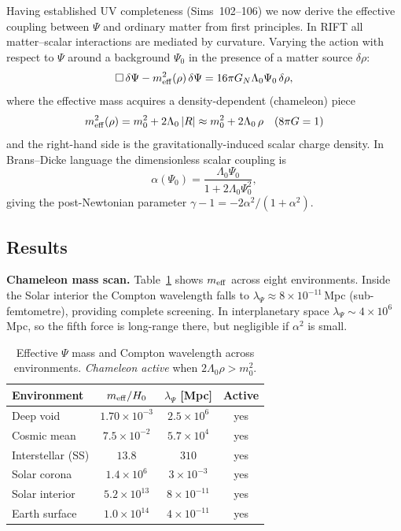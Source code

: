 \documentclass[12pt,a4paper]{article}
\begin{document}
Having established UV completeness (Sims~102--106) we now derive the
effective coupling between $\Psi$ and ordinary matter from first principles.
In RIFT all matter--scalar interactions are mediated by curvature.  Varying
the action with respect to $\Psi$ around a background $\Psi_0$ in the
presence of a matter source $\delta\rho$:
\begin{equation}
  \Box\,\delta\Psi - m_{\rm eff}^2(\rho)\,\delta\Psi
  = 16\pi G_N \Lambda_0 \Psi_0\,\delta\rho ,
  \label{eq:dPsi}
\end{equation}
where the effective mass acquires a density-dependent (chameleon) piece
\begin{equation}
  m_{\rm eff}^2(\rho) = m_0^2 + 2\Lambda_0\,|R| \approx m_0^2 + 2\Lambda_0\,\rho
  \quad (8\pi G=1)
\end{equation}
and the right-hand side is the gravitationally-induced scalar charge density.
In Brans--Dicke language the dimensionless scalar coupling is
\begin{equation}
  \alpha(\Psi_0) = \frac{\Lambda_0\Psi_0}{1 + 2\Lambda_0\Psi_0^2} ,
\end{equation}
giving the post-Newtonian parameter $\gamma-1 = -2\alpha^2/(1+\alpha^2)$.

\subsection{Results}

\textbf{Chameleon mass scan.}
Table~\ref{tab:sim107_env} shows $m_{\rm eff}$ across eight environments.
Inside the Solar interior the Compton wavelength falls to
$\lambda_\Psi \approx 8\times10^{-11}$\,Mpc (sub-femtometre), providing
complete screening.  In interplanetary space $\lambda_\Psi \sim 4\times10^6$\,Mpc,
so the fifth force is long-range there, but negligible if $\alpha^2$ is small.

\begin{table}[h]
\centering
\caption{Effective $\Psi$ mass and Compton wavelength across environments.
\textit{Chameleon active} when $2\Lambda_0\rho > m_0^2$.}
\label{tab:sim107_env}
\begin{tabular}{lccc}
\hline
Environment & $m_{\rm eff}/H_0$ & $\lambda_\Psi$ [Mpc] & Active \\
\hline
Deep void              & $1.70\times10^{-3}$ & $2.5\times10^{6}$ & yes \\
Cosmic mean            & $7.5\times10^{-2}$  & $5.7\times10^{4}$ & yes \\
Interstellar (SS)      & $13.8$              & $310$             & yes \\
Solar corona           & $1.4\times10^{6}$   & $3\times10^{-3}$  & yes \\
Solar interior         & $5.2\times10^{13}$  & $8\times10^{-11}$ & yes \\
Earth surface          & $1.0\times10^{14}$  & $4\times10^{-11}$ & yes \\
\hline
\end{tabular}
\end{table}
\end{document}
